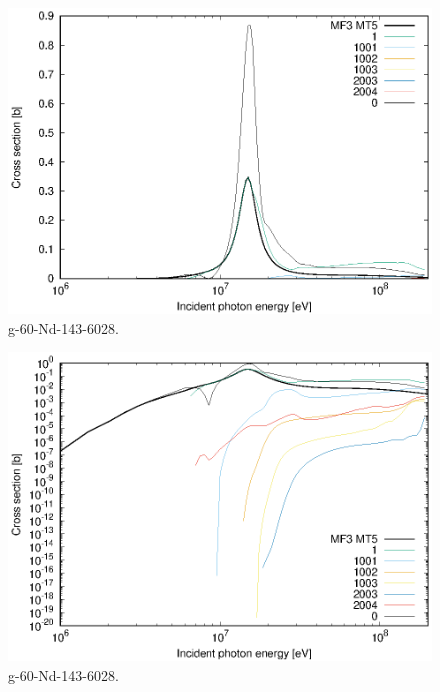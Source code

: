 \begin{figure}
 \includegraphics[width=\linewidth]{eps/g_60-Nd-143_6028.eps}
  \caption{g-60-Nd-143-6028.}
\end{figure}
\begin{figure}
 \includegraphics[width=\linewidth]{eps-log/g_60-Nd-143_6028.eps}
 \caption{g-60-Nd-143-6028.}
\end{figure}
\newpage \clearpage

